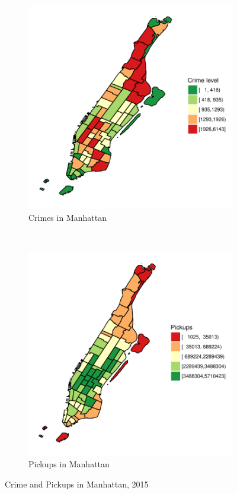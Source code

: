\documentclass{sigkddExp}
\begin{document}

\begin{figure}
    \centering
    \begin{subfigure}[t]{0.5\textwidth}
        \centering
        \includegraphics[width=.9\textwidth]{../img/crimes_per_zone_2015_Manhattan}
        \caption{Crimes in Manhattan}
    \end{subfigure}%
    ~ 
    \begin{subfigure}[t]{0.5\textwidth}
        \centering
        \includegraphics[width=.9\textwidth]{../img/taxis_2015_Manhattan}
        \caption{Pickups in Manhattan}
    \end{subfigure}
    \caption{Crime and Pickups in Manhattan, 2015}
    \label{Manhattan}
  \end{figure}
\end{document}
